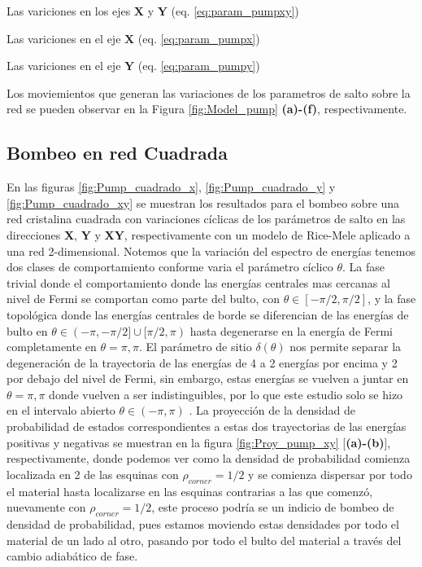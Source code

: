 Las variciones en los ejes $\mathbf{X}$ y $\mathbf{Y}$ (eq. \ref{eq:param_pumpxy})


Las variciones en el eje $\mathbf{X}$ (eq. \ref{eq:param_pumpx})


Las variciones en el eje $\mathbf{Y}$ (eq. \ref{eq:param_pumpy})

Los moviemientos que generan las variaciones de los parametros de salto sobre la red se pueden observar en la Figura \ref{fig:Model_pump} \textbf{(a)-(f)}, respectivamente.




\subsection{Bombeo en red Cuadrada}

En las figuras \ref{fig:Pump_cuadrado_x}, \ref{fig:Pump_cuadrado_y} y \ref{fig:Pump_cuadrado_xy} se muestran los resultados para el bombeo sobre una red cristalina cuadrada con variaciones cíclicas de los parámetros de salto en las direcciones \textbf{X}, \textbf{Y} y \textbf{XY}, respectivamente con un modelo de Rice-Mele aplicado a una red 2-dimensional. Notemos que la variación del espectro de energías tenemos dos clases de comportamiento conforme varia el parámetro cíclico $\theta$. La fase trivial donde el comportamiento donde las energías centrales mas cercanas al nivel de Fermi se comportan como parte del bulto, con $\theta \in [-\pi/2, \pi/2]$, y la fase topológica donde las energías centrales de borde se diferencian de las energías de bulto en $\theta \in (-\pi,-\pi/2] \cup [\pi/2,\pi)$ hasta degenerarse en la energía de Fermi completamente en $\theta = \pi,\pi$. El parámetro de sitio $\delta(\theta)$ nos permite separar la degeneración de la trayectoria de las energías de 4 a 2 energías por encima y 2 por debajo del nivel de Fermi, sin embargo, estas energías se vuelven a juntar en $\theta = \pi,\pi$ donde vuelven a ser indistinguibles, por lo que este estudio solo se hizo en el intervalo abierto $\theta \in (-\pi,\pi)$ . 
La proyección de la densidad de probabilidad de estados correspondientes a estas dos trayectorias de las energías positivas y negativas se muestran en la figura \ref{fig:Proy_pump_xy} [\textbf{(a)-(b)}], respectivamente, donde podemos ver como la densidad de probabilidad comienza localizada en 2 de las esquinas con $\rho_{corner} = 1/2$ y se comienza dispersar por todo el material hasta localizarse en las esquinas contrarias a las que comenzó, nuevamente con $\rho_{corner} = 1/2$, este proceso podría se un indicio de bombeo de densidad de probabilidad, pues estamos moviendo estas densidades por todo el material de un lado al otro, pasando por todo el bulto del material a través del cambio adiabático de fase. 

